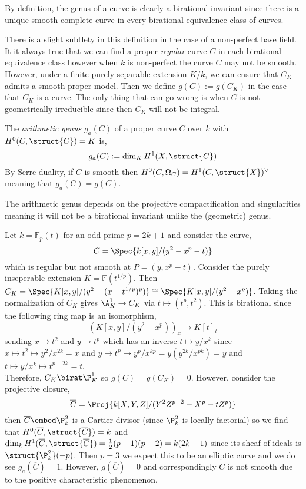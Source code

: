 \documentclass[12pt]{article}
\begin{document}
\begin{rmk}
By definition, the genus of a curve is clearly a birational invariant since there is a unique smooth complete curve in every birational equivalence class of curves. 
\end{rmk}

\begin{rmk}
There is a slight subtlety in this definition in the case of a non-perfect base field. It it always true that we can find a proper \textit{regular} curve $C$ in each birational equivalence class however when $k$ is non-perfect the curve $C$ may not be smooth. However, under a finite purely separable extension $K / k$, we can ensure that $C_K$ admits a smooth proper model. Then we define $g(C) := g(C_K)$ in the case that $C_K$ is a curve. The only thing that can go wrong is when $C$ is not geometrically irreducible since then $C_K$ will not be integral. 
\end{rmk}

\begin{defn}
The \textit{arithmetic genus} $g_a(C)$ of a proper curve $C$ over $k$ with $H^0(C, \struct{C}) = K$ is,
\[ g_a(C) := \dim_K H^1(X, \struct{C}) \]
By Serre duality, if $C$ is smooth then $H^0(C, \Omega_C) = H^1(C, \struct{X})^\vee$ meaning that $g_a(C) = g(C)$. 
\end{defn}

\begin{rmk}
The arithmetic genus depends on the projective compactification and singularities meaning it will not be a birational invariant unlike the (geometric) genus. 
\end{rmk}

\begin{example}
Let $k = \mathbb{F}_p(t)$ for an odd prime $p = 2k + 1$ and consider the curve,
\[ C = \Spec{k[x,y]/(y^2 - x^p - t)} \]
which is regular but not smooth at $P = (y, x^p - t)$. Consider the purely inseperable extension $K = \mathbb{F}(t^{1/p})$. Then $C_K = \Spec{K[x,y]/(y^2 - (x - t^{1/p})^p)} \cong \Spec{K[x,y]/(y^2 - x^p)}$. Taking the normalization of $C_K$ gives $\A^1_K \to C_K$ via $t \mapsto (t^p, t^2)$. This is birational since the following ring map is an isomorphism,
\[ (K[x,y]/(y^2 - x^p))_{x} \to K[t]_{t} \]
sending $x \mapsto t^2$ and $y \mapsto t^p$ which has an inverse $t \mapsto y/x^k$ since $x \mapsto t^2 \mapsto y^2/x^{2k} = x$ and $y \mapsto t^p \mapsto y^{p}/x^{kp} = y (y^{2k}/x^{pk}) = y$ and $t \mapsto y/x^k \mapsto t^{p - 2k} = t$. 
\bigskip\\
Therefore, $C_K \birat \P^1_K$ so $g(C) = g(C_K) = 0$. However, consider the projective closure,
\[ \overline{C} = \Proj{k[X,Y,Z]/(Y^2 Z^{p-2} - X^p - t Z^p)} \]
then $\overline{C} \embed \P^2_k$ is a Cartier divisor (since $\P^2_k$ is locally factorial) so we find that $H^0(\overline{C}, \struct{\overline{C}}) = k$ and $\dim_k H^1(\overline{C}, \struct{\overline{C}}) = \tfrac{1}{2}(p-1)(p-2) = k (2k - 1)$ since its sheaf of ideals is $\struct{\P^2_k}(-p)$. Then $p = 3$ we expect this to be an elliptic curve and we do see $g_a(\overline{C}) = 1$. However, $g(\overline{C}) = 0$ and correspondingly $C$ is not smooth due to the positive characteristic phenomenon. 
\end{example}
\end{document}

